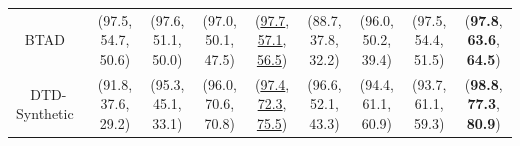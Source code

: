 \begin{table}[t]
{\begin{tabular}{@{}ccccccccc @{}}
BTAD~\cite{BTAD}  & (97.5, 54.7, 50.6)   & (97.6, 51.1, 50.0) & (97.0, 50.1, 47.5) & (\underline{97.7}, \underline{57.1}, \underline{56.5}) & (88.7, 37.8, 32.2) &(96.0, 50.2, 39.4) & (97.5, 54.4, 51.5) &  (\textbf{97.8}, \textbf{63.6}, \textbf{64.5})   \\
DTD-Synthetic~\cite{DTD}   & (91.8, 37.6, 29.2)   & (95.3, 45.1, 33.1) & (96.0, 70.6, 70.8) & (\underline{97.4}, \underline{72.3}, \underline{75.5}) & (96.6, 52.1, 43.3) & (94.4, 61.1, 60.9) & (93.7, 61.1, 59.3) & (\textbf{98.8}, \textbf{77.3}, \textbf{80.9})   \\ \bottomrule[1.5pt]
\end{tabular}
}
\end{table}
\begin{table}[t]
\centering
\caption{Quantitative comparisons of VarAD with alternative methods on public datasets. Results are presented as pixel-level AUROC\%/max-F1\%/AP\%. Best scores are highlighted in \textbf{bold}, while the second-best scores are also \underline{underlined}.}
\label{tab:main_pixel}
\end{table}
